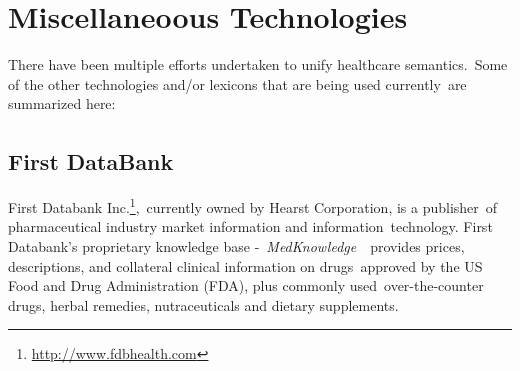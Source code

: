 \documentclass[DIV=calc, paper=a4, fontsize=12pt, onecolumn]{scrartcl}	 %
\begin{document}
\section{Miscellaneoous Technologies}
\label{sec:misc}

There have been multiple efforts undertaken to unify healthcare semantics.\
Some of the other technologies and/or lexicons that are being used currently\
are summarized here:

\subsection{First DataBank\textsuperscript{\texttrademark}}
\label{sec:fdb}
First Databank Inc.\footnote{\url{http://www.fdbhealth.com}},\
currently owned by Hearst Corporation, is a publisher\
of pharmaceutical industry market information and information\
technology. First Databank's proprietary knowledge base -\ 
\emph{MedKnowledge}~\citep{first_databank_fdb_2013}\
provides prices, descriptions, and collateral clinical information on drugs\
approved by the US Food and Drug Administration (FDA), plus commonly used\
over-the-counter drugs, herbal remedies, nutraceuticals and dietary supplements.\\


  
  {}

\end{document}
